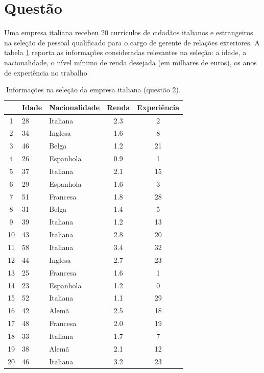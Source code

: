 \documentclass[a4paper,11pt]{article}
\begin{document}
\section{Questão} \label{sec:q2}
Uma empresa italiana recebeu 20 currículos de cidadãos italianos e estrangeiros na seleção
de pessoal qualificado para o cargo de gerente de relações exteriores. A tabela \ref{tab_2} reporta as
informações consideradas relevantes na seleção: a idade, a nacionalidade, o nível mínimo
de renda desejada (em milhares de euros), os anos de experiência no trabalho

\begin{table}[H]
    \centering
    \label{tab_2}
    \begin{tabular}{c l l c c}
        \toprule
        & \textbf{Idade} & \textbf{Nacionalidade} & \textbf{Renda} & \textbf{Experiência} \\
        \midrule
        1 & 28 & Italiana & 2.3 & 2 \\
        2 & 34 & Inglesa & 1.6 & 8 \\
        3 & 46 & Belga & 1.2 & 21 \\
        4 & 26 & Espanhola & 0.9 & 1 \\
        5 & 37 & Italiana & 2.1 & 15 \\
        6 & 29 & Espanhola & 1.6 & 3 \\
        7 & 51 & Francesa & 1.8 & 28 \\
        8 & 31 & Belga & 1.4 & 5 \\
        9 & 39 & Italiana & 1.2 & 13 \\
        10 & 43 & Italiana & 2.8 & 20 \\
        11 & 58 & Italiana & 3.4 & 32 \\
        12 & 44 & Inglesa & 2.7 & 23 \\
        13 & 25 & Francesa & 1.6 & 1 \\
        14 & 23 & Espanhola & 1.2 & 0 \\
        15 & 52 & Italiana & 1.1 & 29 \\
        16 & 42 & Alemã & 2.5 & 18 \\
        17 & 48 & Francesa & 2.0 & 19 \\
        18 & 33 & Italiana & 1.7 & 7 \\
        19 & 38 & Alemã & 2.1 & 12 \\
        20 & 46 & Italiana & 3.2 & 23 \\
        \bottomrule
    \end{tabular}
        \caption{Informações na seleção da empresa italiana (questão 2).}
\end{table}
\end{document}
